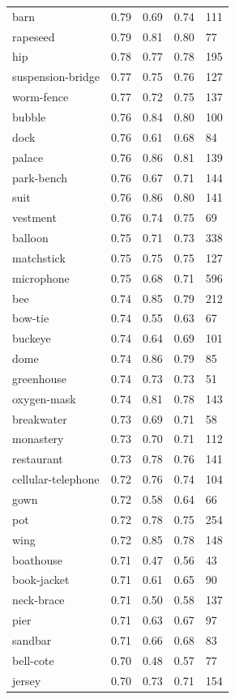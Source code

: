 \begin{center}
\begin{longtable}{lllll}
barn & 0.79 & 0.69 & 0.74 & 111 \\
rapeseed & 0.79 & 0.81 & 0.80 & 77 \\
hip & 0.78 & 0.77 & 0.78 & 195 \\
suspension-bridge & 0.77 & 0.75 & 0.76 & 127 \\
worm-fence & 0.77 & 0.72 & 0.75 & 137 \\
bubble & 0.76 & 0.84 & 0.80 & 100 \\
dock & 0.76 & 0.61 & 0.68 & 84 \\
palace & 0.76 & 0.86 & 0.81 & 139 \\
park-bench & 0.76 & 0.67 & 0.71 & 144 \\
suit & 0.76 & 0.86 & 0.80 & 141 \\
vestment & 0.76 & 0.74 & 0.75 & 69 \\
balloon & 0.75 & 0.71 & 0.73 & 338 \\
matchstick & 0.75 & 0.75 & 0.75 & 127 \\
microphone & 0.75 & 0.68 & 0.71 & 596 \\
bee & 0.74 & 0.85 & 0.79 & 212 \\
bow-tie & 0.74 & 0.55 & 0.63 & 67 \\
buckeye & 0.74 & 0.64 & 0.69 & 101 \\
dome & 0.74 & 0.86 & 0.79 & 85 \\
greenhouse & 0.74 & 0.73 & 0.73 & 51 \\
oxygen-mask & 0.74 & 0.81 & 0.78 & 143 \\
breakwater & 0.73 & 0.69 & 0.71 & 58 \\
monastery & 0.73 & 0.70 & 0.71 & 112 \\
restaurant & 0.73 & 0.78 & 0.76 & 141 \\
cellular-telephone & 0.72 & 0.76 & 0.74 & 104 \\
gown & 0.72 & 0.58 & 0.64 & 66 \\
pot & 0.72 & 0.78 & 0.75 & 254 \\
wing & 0.72 & 0.85 & 0.78 & 148 \\
boathouse & 0.71 & 0.47 & 0.56 & 43 \\
book-jacket & 0.71 & 0.61 & 0.65 & 90 \\
neck-brace & 0.71 & 0.50 & 0.58 & 137 \\
pier & 0.71 & 0.63 & 0.67 & 97 \\
sandbar & 0.71 & 0.66 & 0.68 & 83 \\
bell-cote & 0.70 & 0.48 & 0.57 & 77 \\
jersey & 0.70 & 0.73 & 0.71 & 154 \\

\end{longtable}
\end{center}
